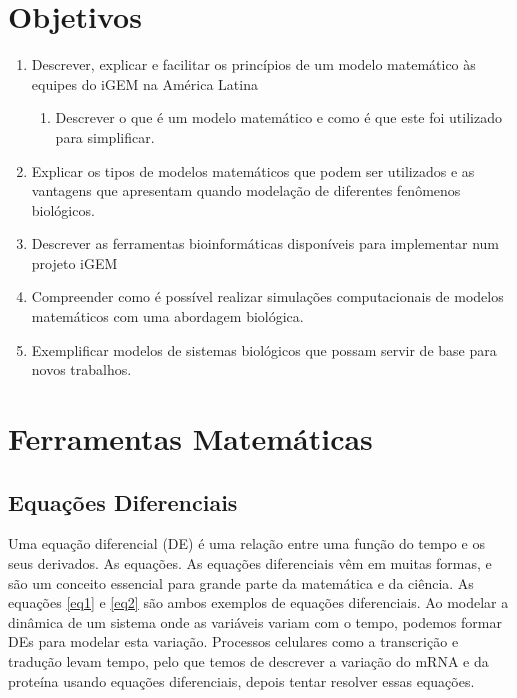 \documentclass[11pt, letterpaper, portuguese]{article}
\begin{document}
\section{Objetivos}

\begin{enumerate}
    \item Descrever, explicar e facilitar os princípios de um modelo matemático às equipes do iGEM na América Latina
 
        \begin{enumerate}
            \item  Descrever o que é um modelo matemático e como é que este foi utilizado para simplificar.


        \end{enumerate}
    \item Explicar os tipos de modelos matemáticos que podem ser utilizados e as vantagens que apresentam quando modelação de diferentes fenômenos biológicos.

    \item Descrever as ferramentas bioinformáticas disponíveis para implementar num projeto iGEM
    \item Compreender como é possível realizar simulações computacionais de modelos matemáticos com uma abordagem biológica.
    \item Exemplificar modelos de sistemas biológicos que possam servir de base para novos trabalhos.
    
\end{enumerate}

\newpage



\newpage

\section{Ferramentas Matemáticas}

\subsection{Equações Diferenciais}

\par{Uma equação diferencial (DE) é uma relação entre uma função do tempo e os seus derivados. As equações. As equações diferenciais vêm em muitas formas, e são um conceito essencial para grande parte da matemática e da ciência. As equações \ref{eq1} e \ref{eq2} são ambos exemplos de equações diferenciais. Ao modelar a dinâmica de um sistema onde as variáveis variam com o tempo, podemos formar DEs para modelar esta variação. Processos celulares como a transcrição e tradução levam tempo, pelo que temos de descrever a variação do mRNA e da proteína usando equações diferenciais, depois tentar resolver essas equações.
}
\end{document}
